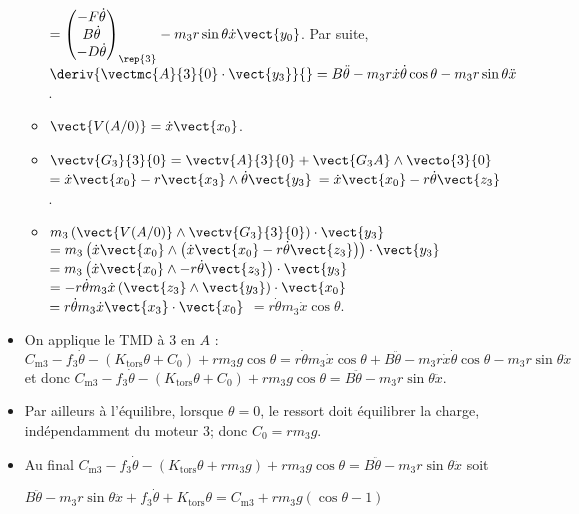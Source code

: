 \begin{corrige}
\begin{itemize}
\begin{itemize}
$ =\begin{pmatrix} -F\dot{\theta}  \\ B\dot{\theta} \\ -D\dot{\theta} \end{pmatrix}_{\rep{3}} -  m_3 r\sin\theta \dot{x}\vect{y_0} $. Par suite, $\deriv{\vectmc{A}{3}{0}\cdot \vect{y_3}}{} = B\ddot{\theta} - m_3 r\dot{x}\dot{\theta}\cos\theta - m_3 r\sin\theta \ddot{x}$.

\item  $\vect{V(A/0)}  = \dot{x}\vect{x_0}$.

\item  $\vectv{G_3}{3}{0}  = \vectv{A}{3}{0}  + \vect{G_3A} \wedge \vecto{3}{0}$  $=\dot{x}\vect{x_0} -r \vect{x_3} \wedge \dot{\theta}\vect{y_3}$ $=\dot{x}\vect{x_0} -r  \dot{\theta}\vect{z_3}$.

\item $m_3 \left(\vect{V(A/0)}\wedge\vectv{G_3}{3}{0}\right)\cdot \vect{y_3}$ 
$ = m_3 \left(\dot{x}\vect{x_0}\wedge\left( \dot{x}\vect{x_0} -r  \dot{\theta}\vect{z_3}\right)\right)\cdot \vect{y_3}$
$ = m_3 \left(\dot{x}\vect{x_0}\wedge -r  \dot{\theta}\vect{z_3} \right)\cdot \vect{y_3}$
$ =-r  \dot{\theta} m_3 \dot{x} \left(\vect{z_3}\wedge \vect{y_3} \right)\cdot \vect{x_0}$
$ =r  \dot{\theta} m_3 \dot{x} \vect{x_3} \cdot \vect{x_0}$
$ =r  \dot{\theta} m_3 \dot{x} \cos \theta $.
\end{itemize}
\item On applique le TMD à 3 en $A$ : $ C_{\text{m3}}-f_3 \dot{\theta} -\left(K_{\text{tors}}\theta + C_0\right) +  rm_3g\cos \theta  = r  \dot{\theta} m_3 \dot{x} \cos \theta  + B\ddot{\theta} - m_3 r\dot{x}\dot{\theta}\cos\theta - m_3 r\sin\theta \ddot{x}$ et donc
$ C_{\text{m3}}-f_3 \dot{\theta} -\left(K_{\text{tors}}\theta + C_0\right) +  rm_3g\cos \theta  = B\ddot{\theta} - m_3 r\sin\theta \ddot{x}$. 
\item Par ailleurs à l'équilibre, lorsque $\theta=0$, le ressort doit équilibrer la charge, indépendamment du moteur 3; donc
$ C_0 =  rm_3g  $. 
\item Au final $ C_{\text{m3}}-f_3 \dot{\theta} -\left(K_{\text{tors}}\theta + rm_3g \right) +  rm_3g\cos \theta  = B\ddot{\theta} - m_3 r\sin\theta \ddot{x}$ soit

$B\ddot{\theta} - m_3 r\sin\theta \ddot{x} + f_3 \dot{\theta} + K_{\text{tors}}\theta=  C_{\text{m3}} + rm_3g \left(\cos \theta - 1 \right)   $
\end{itemize}
\end{corrige}
\else
\fi

